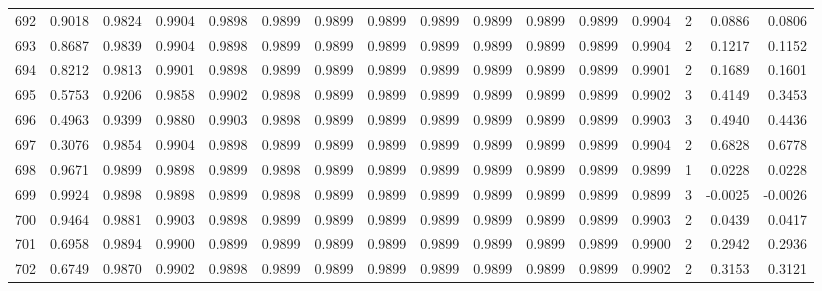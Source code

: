 \begin{tabular}{lrrrrrrrrrrrrrrr}
692 &      0.9018 &  0.9824 &  0.9904 &  0.9898 &  0.9899 &  0.9899 &  0.9899 &  0.9899 &  0.9899 &  0.9899 &   0.9899 &     0.9904 &      2 &                    0.0886 &                     0.0806 \\
693 &      0.8687 &  0.9839 &  0.9904 &  0.9898 &  0.9899 &  0.9899 &  0.9899 &  0.9899 &  0.9899 &  0.9899 &   0.9899 &     0.9904 &      2 &                    0.1217 &                     0.1152 \\
694 &      0.8212 &  0.9813 &  0.9901 &  0.9898 &  0.9899 &  0.9899 &  0.9899 &  0.9899 &  0.9899 &  0.9899 &   0.9899 &     0.9901 &      2 &                    0.1689 &                     0.1601 \\
695 &      0.5753 &  0.9206 &  0.9858 &  0.9902 &  0.9898 &  0.9899 &  0.9899 &  0.9899 &  0.9899 &  0.9899 &   0.9899 &     0.9902 &      3 &                    0.4149 &                     0.3453 \\
696 &      0.4963 &  0.9399 &  0.9880 &  0.9903 &  0.9898 &  0.9899 &  0.9899 &  0.9899 &  0.9899 &  0.9899 &   0.9899 &     0.9903 &      3 &                    0.4940 &                     0.4436 \\
697 &      0.3076 &  0.9854 &  0.9904 &  0.9898 &  0.9899 &  0.9899 &  0.9899 &  0.9899 &  0.9899 &  0.9899 &   0.9899 &     0.9904 &      2 &                    0.6828 &                     0.6778 \\
698 &      0.9671 &  0.9899 &  0.9898 &  0.9899 &  0.9898 &  0.9899 &  0.9899 &  0.9899 &  0.9899 &  0.9899 &   0.9899 &     0.9899 &      1 &                    0.0228 &                     0.0228 \\
699 &      0.9924 &  0.9898 &  0.9898 &  0.9899 &  0.9898 &  0.9899 &  0.9899 &  0.9899 &  0.9899 &  0.9899 &   0.9899 &     0.9899 &      3 &                   -0.0025 &                    -0.0026 \\
700 &      0.9464 &  0.9881 &  0.9903 &  0.9898 &  0.9899 &  0.9899 &  0.9899 &  0.9899 &  0.9899 &  0.9899 &   0.9899 &     0.9903 &      2 &                    0.0439 &                     0.0417 \\
701 &      0.6958 &  0.9894 &  0.9900 &  0.9899 &  0.9899 &  0.9899 &  0.9899 &  0.9899 &  0.9899 &  0.9899 &   0.9899 &     0.9900 &      2 &                    0.2942 &                     0.2936 \\
702 &      0.6749 &  0.9870 &  0.9902 &  0.9898 &  0.9899 &  0.9899 &  0.9899 &  0.9899 &  0.9899 &  0.9899 &   0.9899 &     0.9902 &      2 &                    0.3153 &                     0.3121 \\

\end{tabular}
